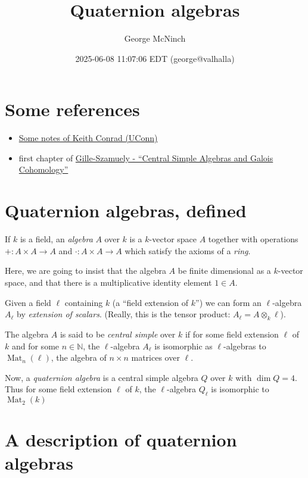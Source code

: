 \documentclass[11pt]{article}
\author{George McNinch}
\date{2025-06-08 11:07:06 EDT (george@valhalla)}
\title{Quaternion algebras}
\numberwithin{equation}{section}
\newcommand{\Mat}{\operatorname{Mat}}
\newcommand{\Nat}{\mathbb{N}}
\begin{document}
\maketitle
\section{Some references}
\label{sec:org71ff2e3}

\begin{itemize}
\item \href{https://kconrad.math.uconn.edu/blurbs/ringtheory/quaternionalg.pdf}{Some notes of Keith Conrad (UConn)}

\item first chapter of \href{https://www.cambridge.org/core/books/central-simple-algebras-and-galois-cohomology/B4A8F430A0D6C5A59722BD48AEF94C05}{Gille-Szamuely - ``Central Simple Algebras and Galois Cohomology''}
\end{itemize}
\section{Quaternion algebras, defined}
\label{sec:org50302f5}

If \(k\) is a field, an \emph{algebra} \(A\) over \(k\) is a \(k\)-vector
space \(A\) together with operations \(+:A \times A \to A\) and
\(\cdot:A \times A \to A\) which satisfy the axioms of a \emph{ring}.

Here, we are going to insist that the algebra \(A\) be finite
dimensional as a \(k\)-vector space, and that there is a
multiplicative identity element \(1 \in A\).

Given a field \(\ell\) containing \(k\) (a ``field extension of \(k\)'')
we can form an \(\ell\)-algebra \(A_\ell\) by \emph{extension of
scalars}. (Really, this is the tensor product: \(A_\ell = A \otimes_k
\ell\)).

The algebra \(A\) is said to be \emph{central simple} over \(k\) if for
some field extension \(\ell\) of \(k\) and for some \(n \in \Nat\), the
\(\ell\)-algebra \(A_\ell\) is isomorphic as \(\ell\)-algebras to
\(\Mat_n(\ell)\), the algebra of \(n \times n\) matrices
over \(\ell\).

Now, a \emph{quaternion algebra} is a central simple algebra \(Q\) over
\(k\) with \(\dim Q = 4\). Thus for some field extension \(\ell\) of
\(k\), the \(\ell\)-algebra \(Q_\ell\) is isomorphic to
\(\Mat_{2}(k)\)
\section{A description of quaternion algebras}
\label{sec:org59895fd}
\end{document}
